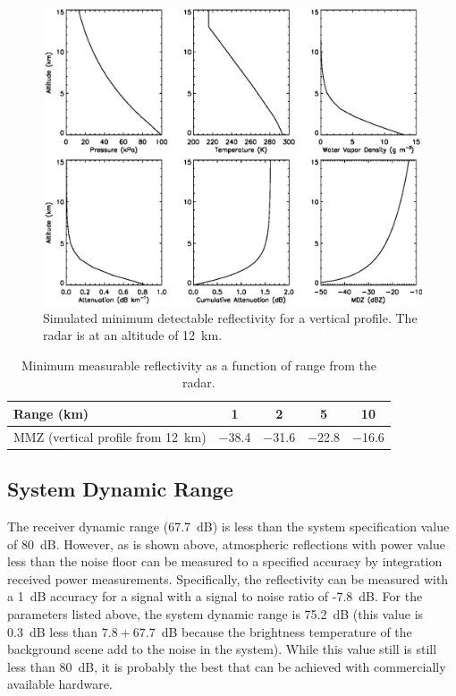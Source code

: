 \documentclass[12pt,letterpaper]{article}
\begin{document}
\begin{figure}[htbp]
  \centering \includegraphics{mdz.eps}
  \caption{Simulated minimum detectable reflectivity for a vertical
  profile. The radar is at an altitude of 12~km.}
  \label{fig:mdz}
\end{figure}

\begin{table}[htbp]
  \renewcommand{\extrarowheight}{2pt}
  \renewcommand{\multirowsetup}{\centering}
  \centering
  \caption{Minimum measurable reflectivity as a function of range
  from the radar.}
  \label{tab:mdz}
  \vspace{0.5em}
  \begin{tabular}{|l|c|c|c|c|}
    \hline
    Range (km) & 1 & 2 & 5 & 10 \\
    \hline
    \multirow{2}{4.5cm}{\raggedright MMZ (vertical profile from 12~km)} & \multirow{2}{*}{$-$38.4} & \multirow{2}{*}{$-$31.6} & \multirow{2}{*}{$-$22.8} & \multirow{2}{*}{$-$16.6} \\
    & & & & \\
    \hline
  \end{tabular}
\end{table}

\subsection{System Dynamic Range}

The receiver dynamic range (67.7~dB) is less than the system
specification value of 80~dB. However, as is shown above, atmospheric
reflections with power value less than the noise floor can be measured
to a specified accuracy by integration received power
measurements. Specifically, the reflectivity can be measured with a
1~dB accuracy for a signal with a signal to noise ratio of
-7.8~dB. For the parameters listed above, the system dynamic range is
75.2~dB (this value is 0.3~dB less than $7.8+67.7$~dB because the
brightness temperature of the background scene add to the noise in the
system). While this value still is still less than 80~dB, it is
probably the best that can be achieved with commercially available
hardware.
\end{document}
